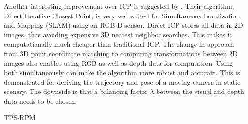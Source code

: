
Another interesting improvement over ICP is suggested by \citet{tykkala2011direct}. Their algorithm, Direct Iterative Closest Point, is very well suited for Simultaneous Localization and Mapping (SLAM) using an RGB-D sensor. Direct ICP stores all data in 2D images, thus avoiding expensive 3D nearest neighbor searches. This makes it computationally much cheaper than traditional ICP. The change in approach from 3D point coordinate matching to computing transformations between 2D images also enables using RGB as well as depth data for computation. Using both simultaneously can make the algorithm more robust and accurate. This is demonstrated for deriving the trajectory and pose of a moving camera in static scenery. The downside is that a balancing factor $\lambda$ between the visual and depth data needs to be chosen.

\citep{chui2003new} TPS-RPM \citep{yang2011thin}

